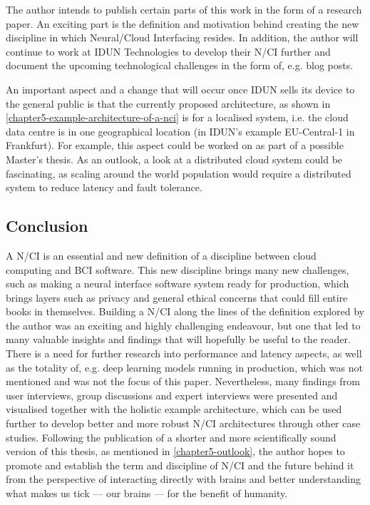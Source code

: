 The author intends to publish certain parts of this work in the form of a research paper. An exciting part is the definition and motivation behind creating the new discipline in which Neural/Cloud Interfacing resides. In addition, the author will continue to work at IDUN Technologies to develop their N/CI further and document the upcoming technological challenges in the form of, e.g. blog posts.

An important aspect and a change that will occur once IDUN sells its device to the general public is that the currently proposed architecture, as shown in \autoref{chapter5-example-architecture-of-a-nci} is for a localised system, i.e. the cloud data centre is in one geographical location (in IDUN's example EU-Central-1 in Frankfurt). For example, this aspect could be worked on as part of a possible Master's thesis. As an outlook, a look at a distributed cloud system could be fascinating, as scaling around the world population would require a distributed system to reduce latency and fault tolerance.

\subsection{Conclusion}
\label{chapter5-conclusion}

A N/CI is an essential and new definition of a discipline between cloud computing and BCI software. This new discipline brings many new challenges, such as making a neural interface software system ready for production, which brings layers such as privacy and general ethical concerns that could fill entire books in themselves. Building a N/CI along the lines of the definition explored by the author was an exciting and highly challenging endeavour, but one that led to many valuable insights and findings that will hopefully be useful to the reader. There is a need for further research into performance and latency aspects, as well as the totality of, e.g. deep learning models running in production, which was not mentioned and was not the focus of this paper. Nevertheless, many findings from user interviews, group discussions and expert interviews were presented and visualised together with the holistic example architecture, which can be used further to develop better and more robust N/CI architectures through other case studies. Following the publication of a shorter and more scientifically sound version of this thesis, as mentioned in \autoref{chapter5-outlook}, the author hopes to promote and establish the term and discipline of N/CI and the future behind it from the perspective of interacting directly with brains and better understanding what makes us tick — our brains — for the benefit of humanity.

